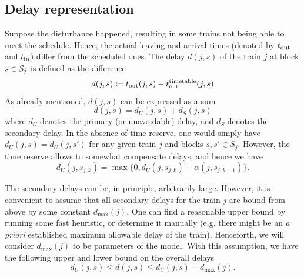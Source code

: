 \subsection{Delay representation}
Suppose the disturbance happened, resulting in some trains not being able to
meet the schedule. Hence, the actual leaving and arrival times (denoted by
$t_\text{out}$ and $t_\text{in}$) differ from the scheduled ones. The delay $d(j, s)$ of the
train $j$ at block $s \in \mathcal{S}_j$ is defined as the difference
\begin{equation}
  \label{eq:djs}
  d(j, s) \coloneqq \tout(j, s) - \ttout(j, s) %
\end{equation}
As already mentioned, $d(j, s)$ can be expressed as a sum
\begin{equation}
  d(j, s) = d_U(j, s) + d_S(j, s)
\end{equation}
where $d_U$ denotes the primary (or unavoidable) delay, and $d_S$ denotes the
secondary delay. In the absence of time reserve, one would simply have $d_U(j,
  s) = d_U(j, s')$ for any given train $j$ and blocks $s,s' \in S_{j}$. However,
the time reserve allows to somewhat compensate delays, and hence we have
\begin{equation}
  d_U(j, s_{j,k}) = \max\{0, d_U(j, s_{j,k}) - \alpha(j, s_{j,k+1})\}.
\end{equation}

The secondary delays can be, in principle, arbitrarily large. However, it is
convenient to assume that all secondary delays for the train $j$ are bound from
above by some constant $d_{\max}(j)$. One can find a reasonable upper bound by
running some fast heuristic, or determine it manually (e.g. there might be an
\emph{a priori} established maximum allowable delay of the train). Henceforth,
we will consider $d_{\max}(j)$ to be parameters of the model. With this
assumption, we have the following upper and lower bound on the overall delays
\begin{equation}
  d_U(j, s) \le d(j, s) \le d_U(j, s) + d_{\max}(j).
\end{equation}

